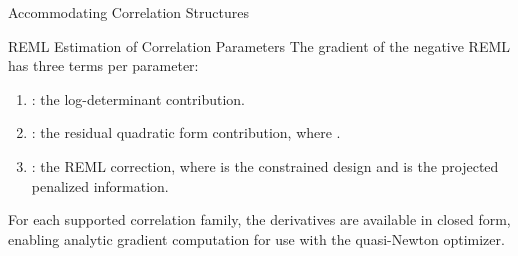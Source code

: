 \begin{Section}{Accommodating Correlation Structures}
\begin{SubSection}{REML Estimation of Correlation Parameters}
The gradient of the negative REML has three terms per parameter:
\begin{enumerate}

\item{} :
the log-determinant contribution.
\item{} :
the residual quadratic form contribution, where
.
\item{} :
the REML correction, where
 is the constrained design and
 is the projected
penalized information.

\end{enumerate}


For each supported correlation family, the derivatives
 are available in closed form,
enabling analytic gradient computation for use with the quasi-Newton
optimizer.
\end{SubSection}



\end{Section}
